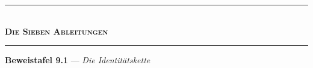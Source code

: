 \documentclass[10pt, openany, oneside]{book}
\renewcommand{\normalsize}{\fontsize{10}{13}\selectfont}
\begin{document}
\vspace{1.5em}


\begin{center}
    \rule{0.3\textwidth}{0.4pt}\\[0.5em]
    {\normalsize\bfseries\scshape Die Sieben Ableitungen}\\[0.3em]
    \rule{0.3\textwidth}{0.4pt}
\end{center}

\vspace{1em}

\textbf{Beweistafel 9.1} --- \textit{Die Identitätskette}

\vspace{0.5em}
\end{document}
